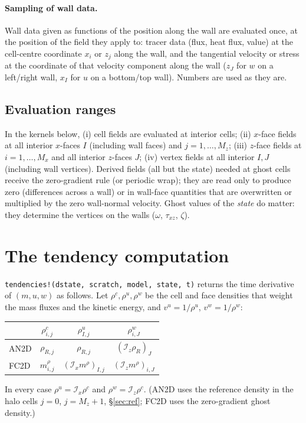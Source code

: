 \documentclass[11pt,a4paper]{article}
\newcommand{\code}[1]{\texttt{#1}}
\newcommand{\Ix}{\mathcal{I}_x}
\newcommand{\Iz}{\mathcal{I}_z}
\begin{document}
\paragraph{Sampling of wall data.} Wall data given as functions of the position along the wall are evaluated once, at the position of the field they apply to: tracer data (flux, heat flux, value) at the cell-centre coordinate $x_i$ or $z_j$ along the wall, and the tangential velocity or stress at the coordinate of that velocity component along the wall ($z_J$ for $w$ on a left/right wall, $x_I$ for $u$ on a bottom/top wall).
Numbers are used as they are.

\subsection{Evaluation ranges}\label{sec:ranges}
In the kernels below, (i) cell fields are evaluated at interior cells; (ii) $x$-face fields at all interior $x$-faces $I$ (including wall faces) and $j=1,\dots,M_z$; (iii) $z$-face fields at $i=1,\dots,M_x$ and all interior $z$-faces $J$; (iv) vertex fields at all interior $I,J$ (including wall vertices).
Derived fields (all but the state) needed at ghost cells receive the zero-gradient rule (or periodic wrap); they are
read only to produce zero (differences across a wall) or in wall-face quantities that are overwritten or multiplied by the zero wall-normal velocity. Ghost values of the \emph{state} do matter: they determine the vertices on the walls ($\omega$, $\tau_{xz}$, $\zeta$).

\section{The tendency computation}\label{sec:shared}
\code{tendencies!(dstate, scratch, model, state, t)} returns the time derivative of $(m,u,w)$ as follows. Let $\rho^c,\rho^u,\rho^w$ be the cell and face densities that weight the mass fluxes and the kinetic energy, and $v^u=1/\rho^u$, $v^w=1/\rho^w$:
\begin{center}\small
\begin{tabular}{lccc}
\hline
 & $\rho^c_{i,j}$ & $\rho^u_{I,j}$ & $\rho^w_{i,J}$ \\ \hline
AN2D & $\rho_{R,j}$ & $\rho_{R,j}$ & $(\Iz\rho_R)_J$ \\
FC2D & $m^\rho_{i,j}$ & $(\Ix m^\rho)_{I,j}$ & $(\Iz m^\rho)_{i,J}$ \\ \hline
\end{tabular}
\end{center}
In every case $\rho^u=\Ix\rho^c$ and $\rho^w=\Iz\rho^c$. (AN2D uses the reference density in the halo cells $j=0$, $j=M_z+1$, \S\ref{sec:ref}; FC2D uses the zero-gradient ghost density.)
\end{document}
